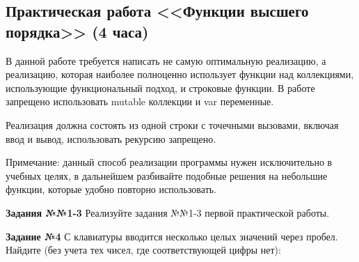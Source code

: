 \subsection{Практическая работа <<Функции высшего порядка>> (4 часа)}
В данной работе требуется написать не самую оптимальную реализацию, а реализацию, 
которая наиболее полноценно использует функции над
коллекциями, использующие функциональный подход, и строковые функции. В работе запрещено использовать mutable коллекции и var переменные.

Реализация должна состоять из одной строки с точечными вызовами, включая ввод и вывод, использовать рекурсию запрещено.

Примечание: данный способ реализации программы нужен исключительно в учебных целях, в дальнейшем разбивайте подобные решения на небольшие функции,
которые удобно повторно использовать.

\textbf{Задания №№1-3} Реализуйте задания №№1-3 первой практической работы.

\textbf{Задание №4} С клавиатуры вводится несколько целых значений через пробел. Найдите (без учета тех чисел, где соответствующей цифры нет):

